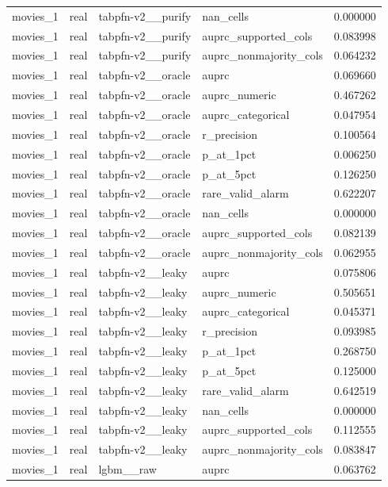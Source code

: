 \begin{tabular}{lllll}
movies\_1 & real & tabpfn-v2\_\_purify & nan\_cells & 0.000000 \\
movies\_1 & real & tabpfn-v2\_\_purify & auprc\_supported\_cols & 0.083998 \\
movies\_1 & real & tabpfn-v2\_\_purify & auprc\_nonmajority\_cols & 0.064232 \\
movies\_1 & real & tabpfn-v2\_\_oracle & auprc & 0.069660 \\
movies\_1 & real & tabpfn-v2\_\_oracle & auprc\_numeric & 0.467262 \\
movies\_1 & real & tabpfn-v2\_\_oracle & auprc\_categorical & 0.047954 \\
movies\_1 & real & tabpfn-v2\_\_oracle & r\_precision & 0.100564 \\
movies\_1 & real & tabpfn-v2\_\_oracle & p\_at\_1pct & 0.006250 \\
movies\_1 & real & tabpfn-v2\_\_oracle & p\_at\_5pct & 0.126250 \\
movies\_1 & real & tabpfn-v2\_\_oracle & rare\_valid\_alarm & 0.622207 \\
movies\_1 & real & tabpfn-v2\_\_oracle & nan\_cells & 0.000000 \\
movies\_1 & real & tabpfn-v2\_\_oracle & auprc\_supported\_cols & 0.082139 \\
movies\_1 & real & tabpfn-v2\_\_oracle & auprc\_nonmajority\_cols & 0.062955 \\
movies\_1 & real & tabpfn-v2\_\_leaky & auprc & 0.075806 \\
movies\_1 & real & tabpfn-v2\_\_leaky & auprc\_numeric & 0.505651 \\
movies\_1 & real & tabpfn-v2\_\_leaky & auprc\_categorical & 0.045371 \\
movies\_1 & real & tabpfn-v2\_\_leaky & r\_precision & 0.093985 \\
movies\_1 & real & tabpfn-v2\_\_leaky & p\_at\_1pct & 0.268750 \\
movies\_1 & real & tabpfn-v2\_\_leaky & p\_at\_5pct & 0.125000 \\
movies\_1 & real & tabpfn-v2\_\_leaky & rare\_valid\_alarm & 0.642519 \\
movies\_1 & real & tabpfn-v2\_\_leaky & nan\_cells & 0.000000 \\
movies\_1 & real & tabpfn-v2\_\_leaky & auprc\_supported\_cols & 0.112555 \\
movies\_1 & real & tabpfn-v2\_\_leaky & auprc\_nonmajority\_cols & 0.083847 \\
movies\_1 & real & lgbm\_\_raw & auprc & 0.063762 \\

\end{tabular}
